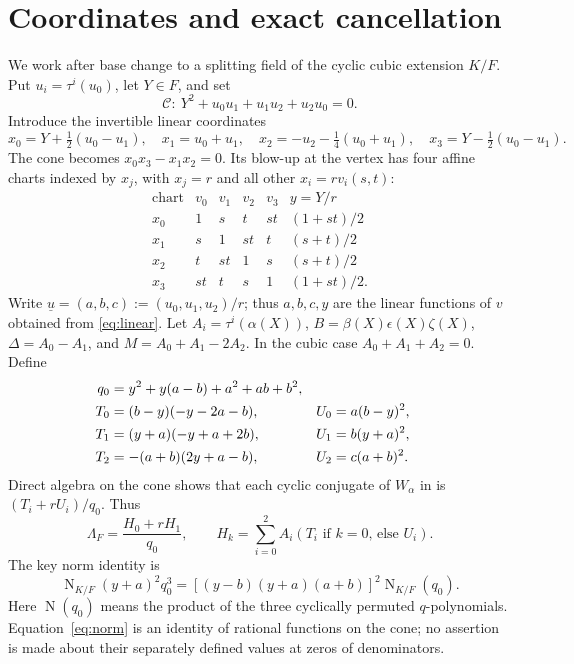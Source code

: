 \documentclass[12pt,letterpaper]{amsart}
\DeclareMathOperator{\Norm}{N}
\begin{document}
\section{Coordinates and exact cancellation}
We work after base change to a splitting field of the cyclic cubic extension $K/F$. Put $u_i=\tau^i(u_0)$, let $Y\in F$, and set
\[
 \mathcal C:\ Y^2+u_0u_1+u_1u_2+u_2u_0=0.
\]
Introduce the invertible linear coordinates
\begin{equation}\label{eq:linear}
 x_0=Y+\tfrac12(u_0-u_1),\quad x_1=u_0+u_1,\quad
 x_2=-u_2-\tfrac14(u_0+u_1),\quad x_3=Y-\tfrac12(u_0-u_1).
\end{equation}
The cone becomes $x_0x_3-x_1x_2=0$. Its blow-up at the vertex has four affine charts indexed by $x_j$, with $x_j=r$ and all other $x_i=r v_i(s,t)$:
\begin{equation}\label{eq:atlas}
\begin{array}{c|rrrr|c}
\text{chart}&v_0&v_1&v_2&v_3&y=Y/r\\\hline
x_0&1&s&t&st&(1+st)/2\\
x_1&s&1&st&t&(s+t)/2\\
x_2&t&st&1&s&(s+t)/2\\
x_3&st&t&s&1&(1+st)/2.
\end{array}
\end{equation}
Write $\underline u=(a,b,c):=(u_0,u_1,u_2)/r$; thus $a,b,c,y$ are the linear functions of $v$ obtained from \eqref{eq:linear}. Let $A_i=\tau^i(\alpha(X))$, $B=\beta(X)\epsilon(X)\zeta(X)$, $\Delta=A_0-A_1$, and $M=A_0+A_1-2A_2$. In the cubic case $A_0+A_1+A_2=0$. Define
\begin{align}\label{eq:adapted}
 q_0&=y^2+y(a-b)+a^2+ab+b^2,\\
 T_0&=(b-y)(-y-2a-b),& U_0&=a(b-y)^2,\notag\\
 T_1&=(y+a)(-y+a+2b),& U_1&=b(y+a)^2,\notag\\
 T_2&=-(a+b)(2y+a-b),& U_2&=c(a+b)^2.\notag
\end{align}
Direct algebra on the cone shows that each cyclic conjugate of $W_\alpha$ in \cite[(8.7h)]{Jo26} is $(T_i+rU_i)/q_0$. Thus
\begin{equation}\label{eq:h}
 \Lambda_F=\frac{H_0+rH_1}{q_0},\qquad
 H_k=\sum_{i=0}^2 A_i(T_i\text{ if }k=0\text{, else }U_i).
\end{equation}
The key norm identity is
\begin{equation}\label{eq:norm}
 \Norm_{K/F}(y+a)^2q_0^3
 =[(y-b)(y+a)(a+b)]^2\Norm_{K/F}(q_0).
\end{equation}
Here $\Norm(q_0)$ means the product of the three cyclically permuted $q$-polynomials. Equation~\eqref{eq:norm} is an identity of rational functions on the cone; no assertion is made about their separately defined values at zeros of denominators.
\end{document}

